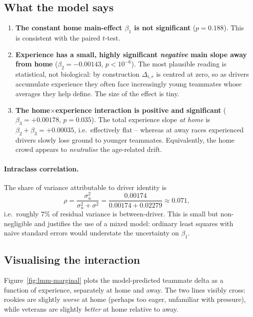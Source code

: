 \documentclass[11pt,a4paper]{article}
\begin{document}
\subsection{What the model says}

\begin{enumerate}[leftmargin=*]
    \item \textbf{The constant home main-effect $\beta_1$ is not significant}
    ($p=0.188$). This is consistent with the paired $t$-test.
    \item \textbf{Experience has a small, highly significant \emph{negative}
    main slope away from home} ($\beta_2=-0.00143$, $p<10^{-6}$). The most
    plausible reading is statistical, not biological: by construction
    $\Delta_{i,r}$ is centred at zero, so as drivers accumulate experience
    they often face increasingly young teammates whose averages they help
    define. The size of the effect is tiny.
    \item \textbf{The home$\times$experience interaction is positive and
    significant} ($\beta_3=+0.00178$, $p=0.035$). The total experience
    slope \emph{at home} is $\beta_2+\beta_3=+0.00035$, i.e.\ effectively
    flat -- whereas at away races experienced drivers slowly lose ground
    to younger teammates. Equivalently, the home crowd appears to
    \emph{neutralise} the age-related drift.
\end{enumerate}

\paragraph{Intraclass correlation.}
The share of variance attributable to driver identity is
\begin{equation}
\rho = \frac{\sigma_u^2}{\sigma_u^2+\sigma^2}
     = \frac{0.00174}{0.00174+0.02279}
     \approx 0.071,
\end{equation}
i.e.\ roughly $7\%$ of residual variance is between-driver. This is small
but non-negligible and justifies the use of a mixed model: ordinary least
squares with naive standard errors would understate the uncertainty on
$\beta_1$.

\subsection{Visualising the interaction}
Figure~\ref{fig:lmm-marginal} plots the model-predicted teammate delta as a
function of experience, separately at home and away. The two lines visibly
cross: rookies are slightly \emph{worse} at home (perhaps too eager,
unfamiliar with pressure), while veterans are slightly \emph{better} at home
relative to away.
\end{document}
